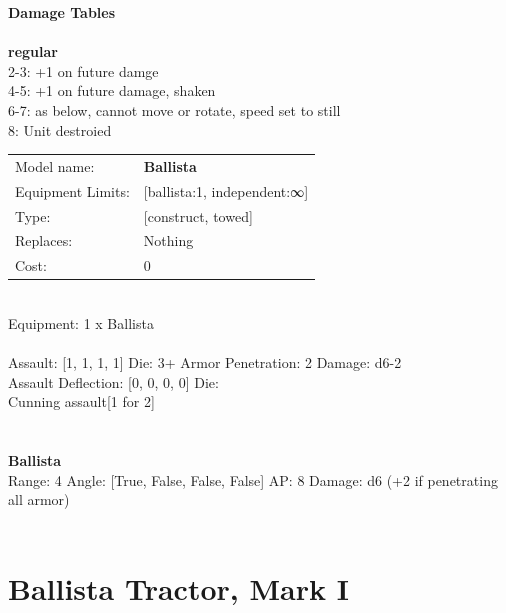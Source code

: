 {\bf Damage Tables} \\
\ \\ {\bf regular } \\
2-3: +1 on future damge \\
4-5: +1 on future damage, shaken \\
6-7: as below, cannot move or rotate, speed set to still \\
8: Unit destroied \\


\noindent
\begin{tabular}{ll}
Model name: &{\bf Ballista } \\
Equipment Limits: &[ballista:1, independent:∞] \\
Type: &[construct, towed] \\
Replaces: &Nothing \\
Cost: & 0\\
\end{tabular}
\ \\
Equipment: 1 x Ballista \\
\ \\
Assault: [1, 1, 1, 1] Die: 3+ Armor Penetration: 2 Damage: d6-2 \\
Assault Deflection: [0, 0, 0, 0] Die: \\
\indent Cunning assault[1 for 2]\\ 
 
\ \\

\ \\
{\bf Ballista } \\



Range: 4  Angle: [True, False, False, False] AP: 8 Damage: d6 (+2 if penetrating all armor) \\




 
\ \\













\clearpage

\section{ Ballista Tractor, Mark I }

